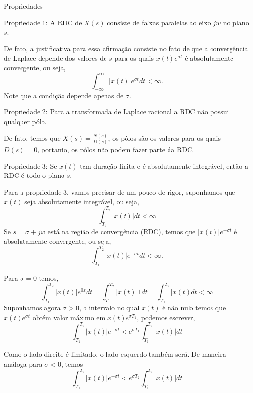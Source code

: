 \documentclass[9pt]{beamer}
\begin{document}
\begin{frame}{Propriedades}
  \begin{block}{Propriedade 1:} 
    A RDC de $ X(s) $ consiste de faixas paralelas ao eixo $jw$ no plano $s$.
    \par
  \justifying
  De fato, a justificativa para essa afirma\c{c}\~{a}o consiste no fato de que a converg\^{e}ncia de Laplace
  depende dos valores de $s$ para os quais $x(t)e^{\sigma t}$ \'{e} absolutamente convergente, ou seja, 
  $$ \int_{-\infty}^{\infty} \vert x(t) \vert e^{\sigma t}dt < \infty .$$
  Note que a condi\c{c}\~{a}o depende apenas  de $ \sigma . $ 
   \end{block}
  \begin{block}{Propriedade 2:} 
    Para  a transformada de Laplace racional a RDC n\~{a}o possui qualquer p\'{o}lo.
    \par
    De fato, temos que $X(s) = \frac {N(s)} {D(s)} $, os p\'{o}los s\~{a}o os valores para os quais $ D(s) = 0$, portanto, os p\'{o}los
    n\~{a}o podem fazer parte da RDC.
  \end{block}
  \begin{block}{Propriedade 3:}
    Se $x(t)$ tem dura\c{c}\~{a}o finita e \'{e} absolutamente integr\'{a}vel, ent\~{a}o a RDC \'{e} todo o plano $s$.
  \end{block}
\end{frame}
\begin{frame}
  Para a propriedade 3, vamos precisar de um pouco de rigor, suponhamos que $x(t)$ seja absolutamente integr\'{a}vel, ou seja, 
  $$ \int_{T_1}^{T_2} \vert x(t) \vert dt  < \infty $$
  Se $s \equal \sigma + jw $ est\'{a} na regi\~{a}o de converg\^{e}ncia (RDC), temos que $ \vert x(t) \vert e^{-\sigma t}$ \'{e} absolutamente convergente, ou seja,
  $$ \int_{T_1}^{T_2} \vert x(t) \vert e^{-\sigma t} dt  < \infty .$$
  \par
  Para $ \sigma \equal 0 $ temos,
  $$ \int_{T_1}^{T_2} \vert x(t) \vert e^{0. t}dt \equal  \int_{T_1}^{T_2} \vert x(t) \vert 1 dt  \equal \int_{T_1}^{T_2} \vert x(t) dt < \infty $$ 
  Suponhamos agora $ \sigma > 0$, o intervalo no qual $x(t)$ \'{e} n\~{a}o nulo temos que $x(t)e^{\sigma t}$ obt\'{e}m valor m\'{a}ximo em $x(t)e^{\sigma T_1}$,
  podemos escrever,
  $$ \int_{T_1}^{T_2} \vert x(t) \vert e^{-\sigma t} <  e^{\sigma T_1} \int_{T_1}^{T_2} \vert x(t) \vert dt $$
  \par
Como o lado direito \'{e} limitado, o lado esquerdo tamb\'{e}m ser\'{a}. De maneira an\'{a}loga para $ \sigma < 0$, temos
$$\int_{T_1}^{T_2} \vert x(t) \vert e^{-\sigma t} <  e^{\sigma T_2} \int_{T_1}^{T_2} \vert x(t) \vert dt$$ 
\end{frame}
\end{document}
